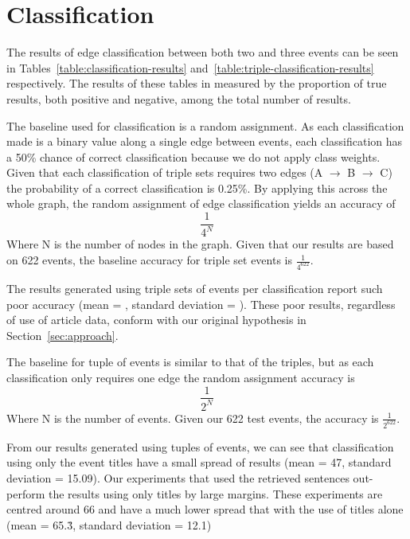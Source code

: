 \documentclass[bsc,frontabs,twoside,singlespacing,parskip,deptreport]{infthesis}     %
\begin{document}
\section{Classification}
The results of edge classification between both two and three events can be seen in Tables~\ref{table:classification-results}
and~\ref{table:triple-classification-results} respectively. The results of these tables in measured by the
proportion of true results, both positive and negative, among the total number of results.

The baseline used for classification is a random assignment.
As each classification made is a binary value along a single edge between events, each classification has a
50\% chance of correct classification because we do not apply class weights.
Given that each classification of triple sets requires two edges (A $\rightarrow$ B $\rightarrow$ C) the probability of a correct
classification is 0.25\%. By applying this across the whole graph, the random assignment of edge classification yields an
accuracy of
\begin{equation}
\frac{1}{4^N} \nonumber
\end{equation}
Where N is the number of nodes in the graph.
Given that our results are based on 622 events, the baseline accuracy for triple set events is $\frac{1}{4^{622}}$.

The results generated using triple sets of events per classification report such poor accuracy
(mean = , standard deviation = ). These poor results, regardless of use of article data,
conform with our original hypothesis in Section~\ref{sec:approach}. 


The baseline for tuple of events is similar to that of the triples, but as each classification only requires one edge
the random assignment accuracy is
\begin{equation}
  \frac{1}{2^N}\nonumber
\end{equation}
Where N is the number of events.
Given our 622 test events, the accuracy is $\frac{1}{2^{622}}$.


From our results generated using tuples of events, we can see that classification using only the event titles
have a small spread of results (mean = 47, standard deviation = 15.09).
Our experiments that used the retrieved sentences out-perform the results using only titles by large margins.
These experiments are centred around 66 and have a much lower spread that with the use of titles alone
(mean = 65.\.{3}, standard deviation = 12.1)
\end{document}
